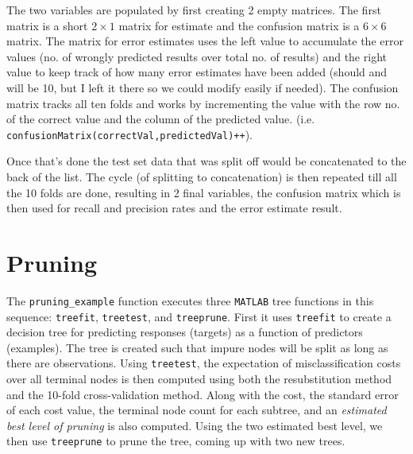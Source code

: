 \documentclass[a4paper,10pt]{article}
\begin{document}
The two variables are populated by first creating 2 empty matrices. The first matrix is a short $2\times1$ matrix for estimate and the confusion matrix is a $6\times6$ matrix. The matrix for error estimates uses the left value to accumulate the error values (no. of wrongly predicted results over total no. of results) and the right value to keep track of how many error estimates have been added (should and will be 10, but I left it there so we could modify easily if needed). The confusion matrix tracks all ten folds and works by incrementing the value with the row no. of the correct value and the column of the predicted value. (i.e. \texttt{confusionMatrix(correctVal,predictedVal)++}).

Once that’s done the test set data that was split off would be concatenated to the back of the list. The cycle (of splitting to concatenation) is then repeated till all the 10 folds are done, resulting in 2 final variables, the confusion matrix which is then used for recall and precision rates and the error estimate result. 

\section*{Pruning}

The \texttt{pruning\_example} function executes three \texttt{MATLAB} tree functions in this sequence: \texttt{treefit}, \texttt{treetest}, and \texttt{treeprune}. First it uses \texttt{treefit} to create a decision tree for predicting responses (targets) as a function of predictors (examples).  The tree is created such that impure nodes will be split as long as there are observations. Using \texttt{treetest}, the expectation of misclassification costs over all terminal nodes is then computed using both the resubstitution method and the 10-fold cross-validation method. Along with the cost, the standard error of each cost value, the terminal node count for each subtree, and an \textit{estimated best level of pruning} is also computed. Using the two estimated best level, we then use \texttt{treeprune} to prune the tree, coming up with two new trees.

\newpage
\end{document}
